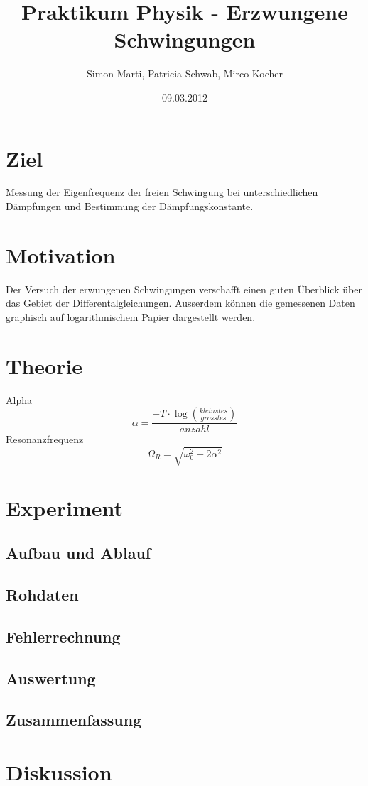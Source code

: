\documentclass[12pt,a4paper]{article}
\title{Praktikum Physik - Erzwungene Schwingungen}
\author{Simon Marti, Patricia Schwab, Mirco Kocher}
\date{09.03.2012}
\begin{document}
\maketitle

\section*{Ziel}
Messung der Eigenfrequenz der freien Schwingung bei unterschiedlichen D\"ampfungen und Bestimmung der D\"ampfungskonstante.

\section*{Motivation}
Der Versuch der erwungenen Schwingungen verschafft einen guten \"Uberblick \"uber das Gebiet der Differentalgleichungen. Ausserdem k\"onnen die gemessenen Daten graphisch auf logarithmischem Papier dargestellt werden. 

\section*{Theorie}
Alpha
\begin{equation}
\alpha = \frac{-T\cdot\log\left( \frac{kleinstes}{grosstes}\right)}{anzahl}
\end{equation}
Resonanzfrequenz
\begin{equation}
\Omega_R = \sqrt{\omega_0^2 - 2\alpha^2}
\end{equation}

\newpage

\section*{Experiment}

\subsection*{Aufbau und Ablauf}

\subsection*{Rohdaten}

\subsection*{Fehlerrechnung}

\subsection*{Auswertung}

\subsection*{Zusammenfassung}


\section*{Diskussion}
\end{document}
